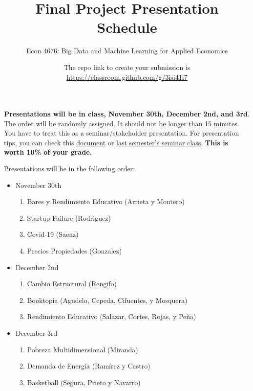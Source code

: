 \documentclass[12pt,onecolumn]{article}
\title{Final Project Presentation Schedule}
\subtitle{Econ 4676: Big Data and Machine Learning for Applied Economics}
\author{}
\date{The repo link to create your submission is \url{https://classroom.github.com/g/3isi41i7}}
\begin{document}
\maketitle


{\bf Presentations will be in class, November 30th, December 2nd, and 3rd}. The order will be randomly assigned. It should not be longer than 15 minutes. You have to treat this as a seminar/stakeholder presentation. For presentation tips, you can check this \href{https://ignaciomsarmiento.github.io/teaching/seminar/Tips_Presentation_PEG.pdf}{document} or  \href{https://ignaciomsarmiento.github.io/teaching/Tesis.html}{last semester's seminar class}. {\bf This is worth 10\% of your grade.}

Presentations will be in the following order:

\begin{itemize}
  \item November 30th
  \begin{enumerate}
      \item Bares y Rendimiento Educativo (Arrieta y Montero)
      \item Startup Failure (Rodriguez)
      \item Covid-19 (Saenz)
      \item Precios Propiedades (Gonzalez)
    \end{enumerate}
    \item December 2nd
    \begin{enumerate}
      \item Cambio Estructural (Rengifo)
      \item Booktopia (Agudelo, Cepeda, Cifuentes, y Mosquera)
      \item Rendimiento Educativo (Salazar, Cortes, Rojas, y Peña)
      \end{enumerate}
      \item December 3rd
      \begin{enumerate}
        \item Pobreza Multidimensional (Miranda)
        \item Demanda de Energía (Ramírez y Castro)
        \item Basketball (Segura, Prieto y Navarro)
      \end{enumerate}
\end{itemize}

 
\end{document}
